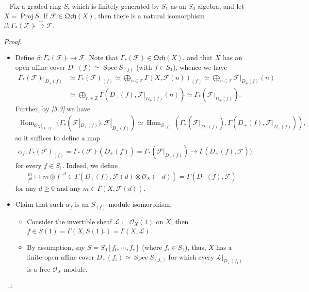 \documentclass[11pt,a4paper,footinclude=true,headinclude=true]{scrbook} %
\DeclareMathOperator{\Spec}{Spec}
\DeclareMathOperator{\Hom}{Hom}
\DeclareMathOperator{\Proj}{Proj}
\newcommand{\FF}{\mathscr{F}}
\newcommand{\LL}{\mathscr{L}}
\newcommand{\OO}{\mathcal{O}}
\newcommand{\<}{\langle}
\newcommand{\>}{\rangle}
\newcommand{\isoto}{\overset{\sim}{\to}}
\newcommand{\qcoh}{\mathfrak{Qch}}
\newenvironment{proposition}[2][]
{\renewcommand\theinnercustomprop{#2}\innercustomprop[#1] 
\begin{mdframed}[backgroundcolor=gray!20]\ }
{\end{mdframed}\endinnercustomprop}
\begin{document}
\begin{proposition}{5.15}
    Fix a graded ring $S$, which is finitely generated by $S_1$ as an $S_0$-algebra, and let $X=\Proj S$. If $\FF\in\qcoh(X)$, then there is a natural isomorphism $\beta:\Gamma_\ast(\FF)\widetilde{}\isoto\FF$.
\end{proposition}
\begin{proof}\mbox{}
    \begin{itemize}
        \item[(I)] Define $\beta:\Gamma_\ast(\FF)\widetilde{}\to\FF$. Note that $\Gamma_\ast(\FF)\widetilde{}\in\qcoh(X)$, and that $X$ has an open affine cover $D_+(f)\simeq\Spec S_{(f)}$ (with $f\in S_1$), whence we have
        \begin{align*}
            \Gamma_\ast(\FF)\widetilde{}|_{D_+(f)} &\simeq\Gamma_\ast(\FF)_{(f)}\simeq\bigoplus_{n\in\mathbb{Z}}\Gamma(X,\FF(n))_{(f)}\simeq\bigoplus_{n\in\mathbb{Z}}\FF|_{D_+(f)}(n)\\ &\simeq\bigoplus_{n\in\mathbb{Z}}\Gamma(D_+(f),\FF|_{D_+(f)}(n))\widetilde{} \simeq\Gamma_\ast(\FF|_{D_+(f)})\widetilde{}.
        \end{align*}
        Further, by \textit{[5.3]} we have 
        \begin{align*}
            \Hom_{\OO_X|_{D_+(f)}}(\Gamma_\ast(\FF|_{D_+(f)})\widetilde{},\FF|_{D_+(f)})\simeq\Hom_{S_{(f)}}(\Gamma_\ast(\FF|_{D_+(f)}),\Gamma(D_+(f),\FF|_{D_+(f)})),
        \end{align*}
        so it suffices to define a map
        \begin{align*}
            \alpha_f:\Gamma_\ast(\FF)_{(f)}=\Gamma_\ast(\FF)\widetilde{}(D_+(f))=\Gamma_\ast(\FF|_{D_+(f)})\to\Gamma(D_+(f),\FF)).
        \end{align*}
         for every $f\in S_1$. Indeed, we define 
         \begin{align*}
             \frac{m}{f^d}\longmapsto m\otimes f^{-d}\in\Gamma(D_+(f),\FF(d)\otimes\OO_X(-d))=\Gamma(D_+(f),\FF)
         \end{align*}
         for any $d\geq0$ and any  $m\in\Gamma(X,\FF(d))$.
         \item[(II)] Claim that such $\alpha_f$ is an $S_{(f)}$-module isomorphism.
         \begin{itemize}
             \item Consider the invertible sheaf $\LL\coloneqq\OO_X(1)$ on $X$, then $f\in S(1)=\Gamma(X,S(1)\widetilde{})=\Gamma(X,\LL)$.
             \item By assumption, say $S=S_0[f_0,\cdots,f_r]$ (where $f_i\in S_1$), thus, $X$ has a finite open affine cover $D_+(f_i)\simeq\Spec S_{(f_i)}$ for which every $\LL|_{D_+(f_i)}$ is a free $\OO_X$-module.

\end{itemize}
\end{itemize}
\end{proof}
\end{document}
